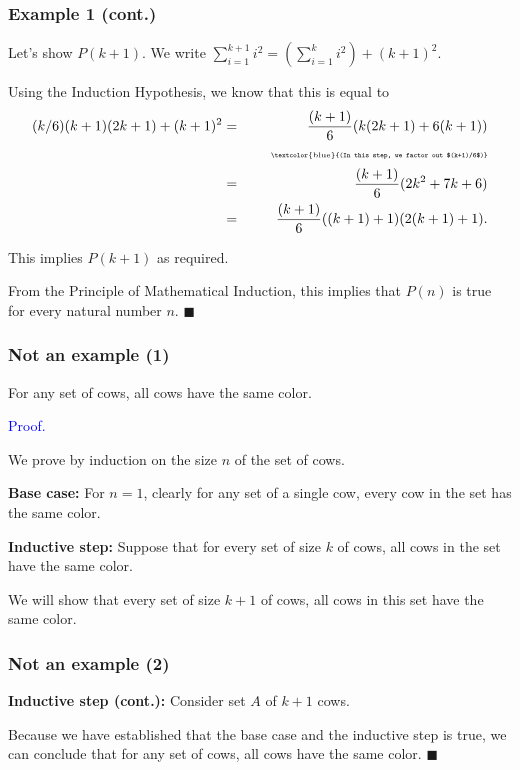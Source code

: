 \begin{frame}\frametitle{Example 1 (cont.)}
  Let's show $P(k+1)$.  We write
  $ \sum_{i=1}^{k+1} i^2 = \left(\sum_{i=1}^k i^2\right) + (k+1)^2 .$
  \vspace{0.15in}

  Using the Induction Hypothesis, we know that this is equal to
  {\small
  \begin{eqnarray*}
    (k/6)(k+1)(2k+1) + (k+1)^2 &=& \frac{(k+1)}{6}(k(2k+1)+6(k+1)) \\
    && \mbox{\tiny \ \ \ \ \ \ \textcolor{blue}{(In this step, we factor out $(k+1)/6$)}} \\
    &=& \frac{(k+1)}{6}(2k^2+7k+6) \\
    &=& \frac{(k+1)}{6}((k+1)+1)(2(k+1)+1).
  \end{eqnarray*}
  }
  
  This implies $P(k+1)$ as required.
  
  From the Principle of Mathematical Induction, this implies that
  $P(n)$ is true for every natural number $n$. $\blacksquare$
\end{frame}

\begin{frame}\frametitle{Not an example (1)}
  \begin{theorem}
    For any set of cows, all cows have the same color.
  \end{theorem}
  \textcolor{blue}{Proof.}

  We prove by induction on the size $n$ of the set of cows.
  \pause
  
  {\bf Base case:} For $n=1$, clearly for any set of a single cow,
  every cow in the set has the same color.
  \pause
  
  {\bf Inductive step:} Suppose that for every set of size $k$ of
  cows, all cows in the set have the same color.
  
  We will show that every set of size $k+1$ of cows, all cows in
  this set have the same color.
\end{frame}

\begin{frame}\frametitle{Not an example (2)}
  {\bf Inductive step (cont.):} Consider set $A$ of $k+1$ cows.

  \vspace{2.2in}
  \pause

  Because we have established that the base case and the inductive
  step is true, we can conclude that for any set of cows, all cows
  have the same color. $\blacksquare$
  
\end{frame}

